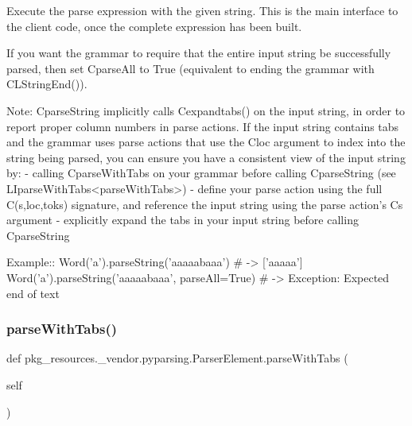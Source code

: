 \begin{DoxyVerb}Execute the parse expression with the given string.
This is the main interface to the client code, once the complete
expression has been built.

If you want the grammar to require that the entire input string be
successfully parsed, then set C{parseAll} to True (equivalent to ending
the grammar with C{L{StringEnd()}}).

Note: C{parseString} implicitly calls C{expandtabs()} on the input string,
in order to report proper column numbers in parse actions.
If the input string contains tabs and
the grammar uses parse actions that use the C{loc} argument to index into the
string being parsed, you can ensure you have a consistent view of the input
string by:
 - calling C{parseWithTabs} on your grammar before calling C{parseString}
   (see L{I{parseWithTabs}<parseWithTabs>})
 - define your parse action using the full C{(s,loc,toks)} signature, and
   reference the input string using the parse action's C{s} argument
 - explicitly expand the tabs in your input string before calling
   C{parseString}

Example::
    Word('a').parseString('aaaaabaaa')  # -> ['aaaaa']
    Word('a').parseString('aaaaabaaa', parseAll=True)  # -> Exception: Expected end of text
\end{DoxyVerb}
 \mbox{\label{classpkg__resources_1_1__vendor_1_1pyparsing_1_1ParserElement_a7216c068aabd74018dc9d34c07099d71}} 
\subsubsection{\texorpdfstring{parse\+With\+Tabs()}{parseWithTabs()}}
{\footnotesize\ttfamily def pkg\+\_\+resources.\+\_\+vendor.\+pyparsing.\+Parser\+Element.\+parse\+With\+Tabs (\begin{DoxyParamCaption}\item[{}]{self }\end{DoxyParamCaption})}

